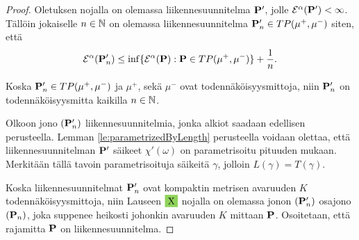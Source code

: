 \begin{proof}
    
    Oletuksen nojalla on olemassa liikennesuunnitelma $\P'$, jolle $\E^\alpha(\P') < \infty$.
    Tällöin jokaiselle $n\in\N$ on olemassa liikennesuunnitelma $\P_n'\in TP(\mu^+, \mu^-)$ siten, että 
        \begin{equation*}
            \E^\alpha(\P_n') \le \inf \{\E^\alpha(\P): \P\in TP(\mu^+, \mu^-)\} + \frac{1}{n}.
        \end{equation*}
    
    Koska $\P_n' \in TP(\mu^+, \mu^-)$ ja $\mu^+$, sekä $\mu^-$ ovat todennäköisyysmittoja, niin $\P_n'$ on todennäköisyysmitta kaikilla $n \in \N$.
    
    Olkoon jono $(\P_n')$ liikennesuunnitelmia, jonka alkiot saadaan edellisen perusteella. Lemman \ref{le:parametrizedByLength} perusteella voidaan olettaa, että liikennesuunnitelman $\P'$ säikeet $\chi'(\omega)$ on parametrisoitu pituuden mukaan. Merkitään tällä tavoin parametrisoituja säikeitä $\gamma$, jolloin $L(\gamma) = T(\gamma)$. 
    
    Koska liikennesuunnitelmat $\P_n'$ ovat kompaktin metrisen avaruuden $K$ todennäköisyysmittoja, niin Lauseen $\define{X}$ nojalla on olemassa jonon $(\P_n')$ osajono $(\P_n)$, joka suppenee heikosti johonkin avaruuden $K$ mittaan $\P$. Osoitetaan, että rajamitta $\P$ on liikennesuunnitelma.
    

\end{proof}
